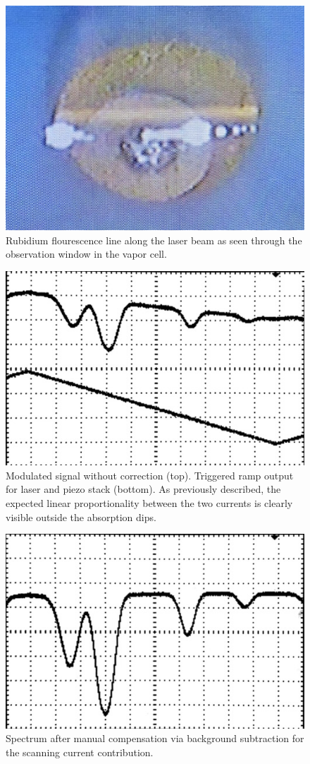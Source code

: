 \begin{figure}
    \centering
    \includegraphics[width=0.48\linewidth]{content/measurement/fluorescence.jpg}
    \captionsetup{width=0.58\linewidth}
    \caption{Rubidium flourescence line along the laser beam as seen through the observation window in the vapor cell.}
    \label{fig:fluorescence}
\end{figure}

\begin{figure}
    \centering
    \includegraphics[width=0.72\linewidth]{content/measurement/ramp.jpg}
    \captionsetup{width=0.8\linewidth}
    \caption{Modulated signal without correction (top). Triggered ramp output for laser and piezo stack (bottom).
             As previously described, the expected linear proportionality between the two currents is clearly visible
             outside the absorption dips.}
    \label{fig:ramp}
\end{figure}

\begin{figure}
    \centering
    \includegraphics[width=0.72\linewidth]{content/measurement/spectrum.jpg}
    \captionsetup{width=0.8\linewidth}
    \caption{Spectrum after manual compensation via background subtraction for the scanning current contribution.}
    \label{fig:spectrum}
\end{figure}
